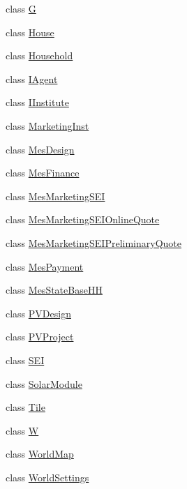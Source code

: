 \begin{DoxyCompactItemize}
\item 
class \hyperlink{classsolar__core_1_1_g}{G}
\item 
class \hyperlink{classsolar__core_1_1_house}{House}
\item 
class \hyperlink{classsolar__core_1_1_household}{Household}
\item 
class \hyperlink{classsolar__core_1_1_i_agent}{I\+Agent}
\item 
class \hyperlink{classsolar__core_1_1_i_institute}{I\+Institute}
\item 
class \hyperlink{classsolar__core_1_1_marketing_inst}{Marketing\+Inst}
\item 
class \hyperlink{classsolar__core_1_1_mes_design}{Mes\+Design}
\item 
class \hyperlink{classsolar__core_1_1_mes_finance}{Mes\+Finance}
\item 
class \hyperlink{classsolar__core_1_1_mes_marketing_s_e_i}{Mes\+Marketing\+S\+E\+I}
\item 
class \hyperlink{classsolar__core_1_1_mes_marketing_s_e_i_online_quote}{Mes\+Marketing\+S\+E\+I\+Online\+Quote}
\item 
class \hyperlink{classsolar__core_1_1_mes_marketing_s_e_i_preliminary_quote}{Mes\+Marketing\+S\+E\+I\+Preliminary\+Quote}
\item 
class \hyperlink{classsolar__core_1_1_mes_payment}{Mes\+Payment}
\item 
class \hyperlink{classsolar__core_1_1_mes_state_base_h_h}{Mes\+State\+Base\+H\+H}
\item 
class \hyperlink{classsolar__core_1_1_p_v_design}{P\+V\+Design}
\item 
class \hyperlink{classsolar__core_1_1_p_v_project}{P\+V\+Project}
\item 
class \hyperlink{classsolar__core_1_1_s_e_i}{S\+E\+I}
\item 
class \hyperlink{classsolar__core_1_1_solar_module}{Solar\+Module}
\item 
class \hyperlink{classsolar__core_1_1_tile}{Tile}
\item 
class \hyperlink{classsolar__core_1_1_w}{W}
\item 
class \hyperlink{classsolar__core_1_1_world_map}{World\+Map}
\item 
class \hyperlink{classsolar__core_1_1_world_settings}{World\+Settings}
\end{DoxyCompactItemize}
